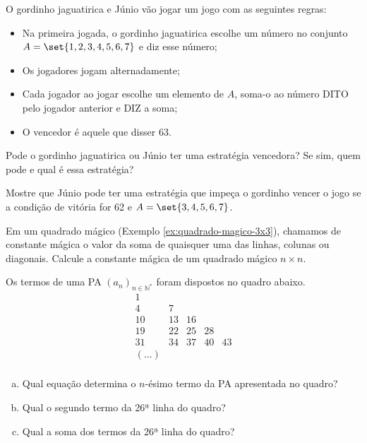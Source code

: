\begin{exercise}
    O gordinho jaguatirica e Júnio vão jogar um  jogo com as
seguintes regras:
\begin{itemize}
  \item Na primeira jogada, o gordinho jaguatirica escolhe um número no
  conjunto $A = \set{1, 2, 3, 4, 5, 6, 7}$ e diz esse número;
  \item Os jogadores jogam alternadamente;
  \item Cada jogador ao jogar escolhe um elemento de $A$, soma-o ao
  número DITO pelo jogador anterior e DIZ a soma;
  \item O vencedor é aquele que disser 63.
\end{itemize}
Pode o gordinho jaguatirica ou Júnio ter uma estratégia vencedora?
Se sim, quem pode e qual é essa estratégia?
\end{exercise}



\begin{exercise}
    Mostre que Júnio pode ter uma estratégia que impeça o gordinho
vencer o jogo se a condição de vitória for 62 e $A =\set{3, 4, 5, 6,
7}$. 
\end{exercise}

\begin{exercise}
    Em um quadrado mágico (Exemplo \ref{ex:quadrado-magico-3x3}),
chamamos de constante mágica o valor da soma de quaisquer uma das
linhas, colunas ou diagonais. Calcule a constante mágica de um
quadrado mágico $n \times n$.
\end{exercise}

\begin{exercise}
    Os termos de uma PA $(a_n)_{n \in \mathbb N^*}$ foram dispostos no quadro abaixo.
       $$\begin{array}{ccccc}
        1&  &  &  &  \\
        4&  7&  &  &  \\
        10&  13&  16&  &  \\
        19&  22&  25&  28&  \\
        31&  34&  37&  40&  43\\
        (\dots)&  &  &  &  \\
       \end{array}$$  

    \begin{enumerate}[a)]
        \item Qual equação determina o $n$-ésimo termo da PA apresentada no quadro?
        \item Qual o segundo termo da 26ª linha do quadro? 
        \item Qual a soma dos termos da 26ª linha do quadro? 
     \end{enumerate}
\end{exercise}

